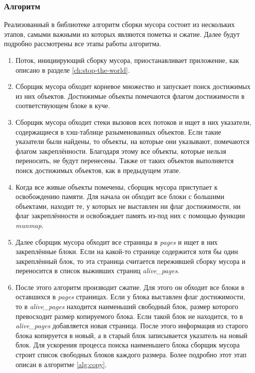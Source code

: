 \subsubsection{Алгоритм}
Реализованный в библиотеке алгоритм сборки мусора состоит из нескольких этапов, самыми важными из которых являются пометка и сжатие. Далее будут подробно рассмотрены все этапы работы алгоритма.
\begin{enumerate}
\item Поток, инициирующий сборку мусора, приостанавливает приложение, как описано в разделе \ref{ch:stop-the-world}.
\item Сборщик мусора обходит корневое множество и запускает поиск достижимых из них объектов. Достижимые объекты помечаются флагом достижимости в соответствующем блоке в куче.
\item Сборщик мусора обходит стеки вызовов всех потоков и ищет в них указатели, содержащиеся в  хэш-таблице разыменованных объектов. Если такие указатели были найдены, то объекты, на которые они указывают, помечаются флагом закреплённости.
Благодаря этому все объекты, которые нельзя переносить, не будут перенесены. Также от таких объектов выполняется поиск достижимых объектов, как в предыдущем этапе. \label{step:deref}
\item Когда все живые объекты помечены, сборщик мусора приступает к освобождению памяти. Для начала он обходит все блоки с большими объектами, находит те, у которых не выставлен ни флаг достижимости, ни флаг закреплённости и освобождает память из-под них с помощью функции \textit{munmap}.
\item Далее сборщик мусора обходит все страницы в \textit{pages} и ищет в них закреплённые блоки. Если на какой-то странице содержится хотя бы один закреплённый блок, то эта страница считается пережившей сборку мусора и переносится в список выживших страниц \textit{alive\_pages}.
\item После этого алгоритм производит сжатие. Для этого он обходит все блоки в оставшихся в \textit{pages} страницах. Если у блока выставлен флаг достижимости, то в \textit{alive\_pages} находится наименьший свободный блок, размер которого превосходит размер копируемого блока. Если такой блок не находится, то в \textit{alive\_pages} добавляется новая страница. После этого информация из старого блока копируется в новый, а в старый блок записывается указатель на новый блок. Для ускорения процесса поиска наименьшего блока сборщик мусора строит список свободных блоков каждого размера. Более подробно этот этап описан в алгоритме \ref{alg:copy}.

\end{enumerate}
